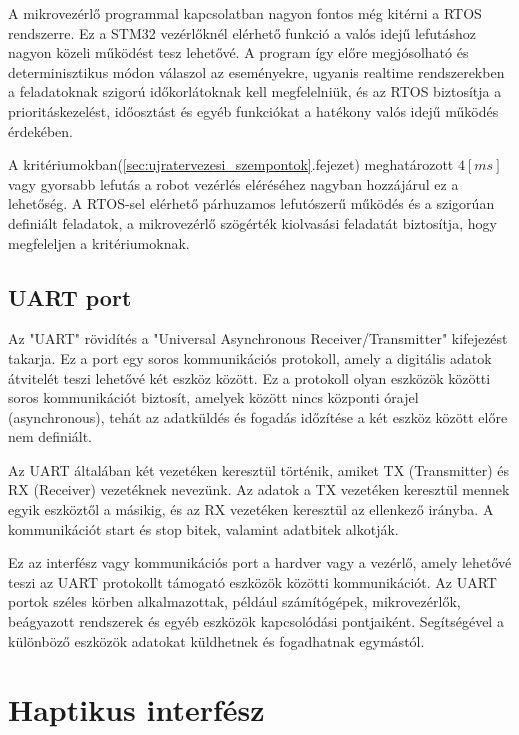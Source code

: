 A mikrovezérlő programmal kapcsolatban nagyon fontos még kitérni a RTOS rendszerre. Ez a STM32 vezérlőknél elérhető funkció a valós idejű lefutáshoz nagyon közeli működést tesz lehetővé. A program így előre megjósolható és determinisztikus módon válaszol az eseményekre, ugyanis realtime rendszerekben a feladatoknak szigorú időkorlátoknak kell megfelelniük, és az RTOS biztosítja a prioritáskezelést, időosztást és egyéb funkciókat a hatékony valós idejű működés érdekében.


A kritériumokban(\ref{sec:ujratervezesi_szempontok}.fejezet) meghatározott $4[ms]$ vagy gyorsabb lefutás a robot vezérlés eléréséhez nagyban hozzájárul ez a lehetőség. A RTOS-sel elérhető párhuzamos lefutószerű működés és a szigorúan definiált feladatok, a mikrovezérlő szögérték kiolvasási feladatát biztosítja, hogy megfeleljen a kritériumoknak.

\subsection{UART port}
\label{sec:uart_port}

Az "UART" rövidítés a "Universal Asynchronous Receiver/Transmitter" kifejezést takarja. Ez a port egy soros kommunikációs protokoll, amely a digitális adatok átvitelét teszi lehetővé két eszköz között. Ez a protokoll olyan eszközök közötti soros kommunikációt biztosít, amelyek között nincs központi órajel (asynchronous), tehát az adatküldés és fogadás időzítése a két eszköz között előre nem definiált.

Az UART általában két vezetéken keresztül történik, amiket TX (Transmitter) és RX (Receiver) vezetéknek nevezünk. Az adatok a TX vezetéken keresztül mennek egyik eszköztől a másikig, és az RX vezetéken keresztül az ellenkező irányba. A kommunikációt start és stop bitek, valamint adatbitek alkotják.

Ez az interfész  vagy kommunikációs port a hardver vagy a vezérlő, amely lehetővé teszi az UART protokollt támogató eszközök közötti kommunikációt. Az UART portok széles körben alkalmazottak, például számítógépek, mikrovezérlők, beágyazott rendszerek és egyéb eszközök kapcsolódási pontjaiként. Segítségével a különböző eszközök adatokat küldhetnek és fogadhatnak egymástól.


\section{Haptikus interfész}

